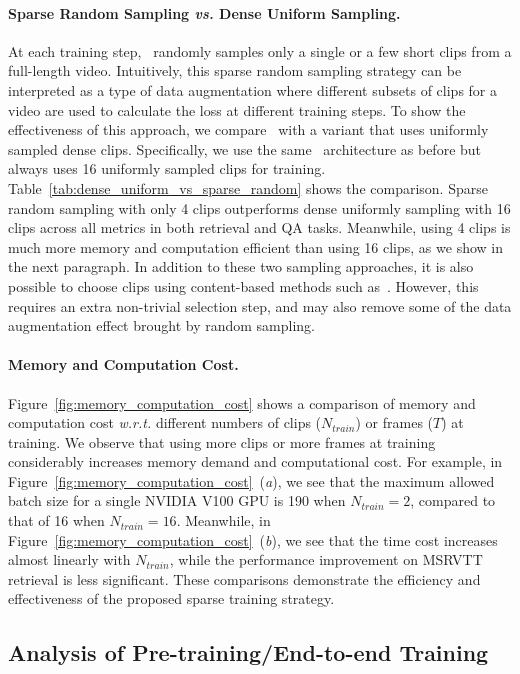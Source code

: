 \paragraph{Sparse Random Sampling \textit{vs.} Dense Uniform Sampling.} 
At each training step, \ModelName~randomly samples only a single or a few short clips from a full-length video.
Intuitively, this sparse random sampling strategy can be interpreted as a type of data augmentation where different subsets of clips for a video are used to calculate the loss at different training steps.
To show the effectiveness of this approach, we compare \ModelName~with a variant that uses uniformly sampled dense clips.
Specifically, we use the same \ModelName~architecture as before but always uses 16 uniformly sampled clips for training.
Table~\ref{tab:dense_uniform_vs_sparse_random} shows the comparison. 
Sparse random sampling with only 4 clips outperforms dense uniformly sampling with 16 clips across all metrics in both retrieval and QA tasks.
Meanwhile, using 4 clips is much more memory and computation efficient than using 16 clips, as we show in the next paragraph.
In addition to these two sampling approaches, it is also possible to choose clips using content-based methods such as~\cite{wu2019adaframe}. 
However, this requires an extra non-trivial selection step, and may also remove some of the data augmentation effect brought by random sampling.



\paragraph{Memory and Computation Cost.} 
Figure~\ref{fig:memory_computation_cost} shows a comparison of memory and computation cost \emph{w.r.t.} different numbers of clips ($N_{train}$) or frames ($T$) at training. 
We observe that using more clips or more frames at training considerably increases memory demand and computational cost.
For example, in Figure~\ref{fig:memory_computation_cost}~(\textit{a}), we see that the maximum allowed batch size for a single NVIDIA V100 GPU is 190 when $N_{train}{=}2$, compared to that of 16 when $N_{train}{=}16$.
Meanwhile, in Figure~\ref{fig:memory_computation_cost}~(\textit{b}), we see that the time cost increases almost linearly with $N_{train}$, while the performance improvement on MSRVTT retrieval is less significant.
These comparisons demonstrate the efficiency and effectiveness of the proposed sparse training strategy.


\subsection{Analysis of Pre-training/End-to-end Training}\label{subsec:analysis_pretraining_and_e2e_training}



